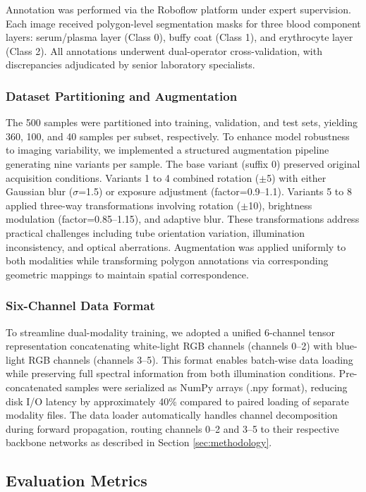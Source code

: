 \documentclass[journal,twoside,web]{ieeecolor}
\begin{document}
Annotation was performed via the Roboflow platform under expert supervision. Each image received polygon-level segmentation masks for three blood component layers: serum/plasma layer (Class 0), buffy coat (Class 1), and erythrocyte layer (Class 2). All annotations underwent dual-operator cross-validation, with discrepancies adjudicated by senior laboratory specialists.

\subsubsection{Dataset Partitioning and Augmentation} The 500 samples were partitioned into training, validation, and test sets, yielding 360, 100, and 40 samples per subset, respectively. To enhance model robustness to imaging variability, we implemented a structured augmentation pipeline generating nine variants per sample. The base variant (suffix 0) preserved original acquisition conditions. Variants 1 to 4 combined rotation ($\pm$5\degree) with either Gaussian blur ($\sigma$=1.5) or exposure adjustment (factor=0.9--1.1). Variants 5 to 8 applied three-way transformations involving rotation ($\pm$10\degree), brightness modulation (factor=0.85--1.15), and adaptive blur. These transformations address practical challenges including tube orientation variation, illumination inconsistency, and optical aberrations. Augmentation was applied uniformly to both modalities while transforming polygon annotations via corresponding geometric mappings to maintain spatial correspondence.

\subsubsection{Six-Channel Data Format} To streamline dual-modality training, we adopted a unified 6-channel tensor representation concatenating white-light RGB channels (channels 0--2) with blue-light RGB channels (channels 3--5). This format enables batch-wise data loading while preserving full spectral information from both illumination conditions. Pre-concatenated samples were serialized as NumPy arrays (.npy format), reducing disk I/O latency by approximately 40\% compared to paired loading of separate modality files. The data loader automatically handles channel decomposition during forward propagation, routing channels 0--2 and 3--5 to their respective backbone networks as described in Section \ref{sec:methodology}.

\subsection{Evaluation Metrics}
\end{document}
